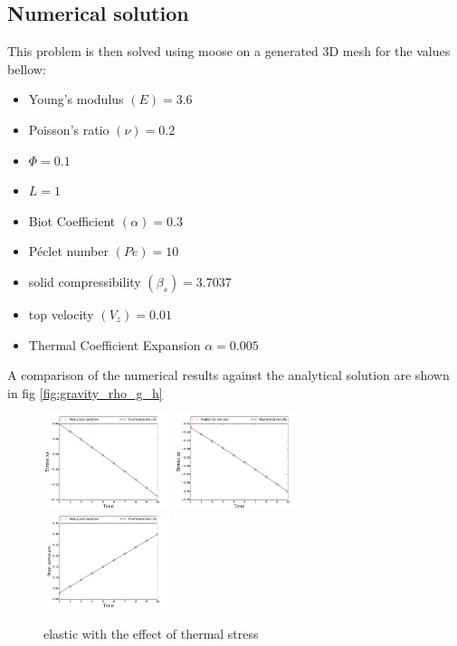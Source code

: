 \documentclass[]{scrreprt}
\begin{document}
\subsection{Numerical solution}
This problem is then solved using moose on a generated 3D mesh for the values bellow:
\begin{itemize}
\item Young's modulus $(E)=3.6$\
\item Poisson's ratio $(\nu) =0.2$\
\item $\Phi=0.1$\
\item $L=1$\
\item Biot Coefficient $(\alpha)=0.3$\
\item P\'{e}clet number $(Pe)=10$\
\item solid compressibility $(\beta_s)=3.7037$\
\item top velocity $(V_z) =0.01$\
\item Thermal Coefficient Expansion $\alpha=0.005$\

\end{itemize}
A comparison of the numerical results against the analytical solution are shown in fig \ref{fig:gravity_rho_g_h}
\begin{figure}
\label{fig:benchmark8_THM_elastic}
  \centering
  \includegraphics[width=0.33\textwidth]{benchmark_8_THM/benchmark_8_THM_bench_THM_elastic_stress_xx}
  \includegraphics[width=0.33\textwidth]{benchmark_8_THM/benchmark_8_THM_bench_THM_elastic_stress_zz}\\
  \includegraphics[width=0.33\textwidth]{benchmark_8_THM/benchmark_8_THM_bench_THM_elastic_p0}
  \caption{elastic with the effect of thermal stress }
 \end{figure}
\end{document}

